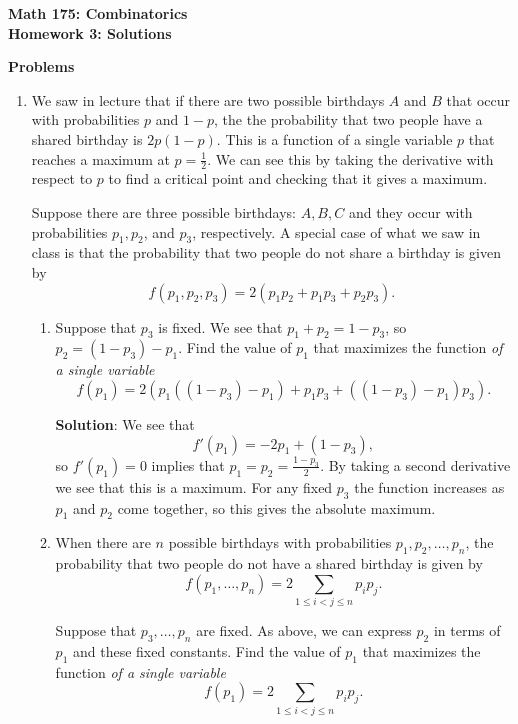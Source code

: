 \documentclass[11pt]{article}
\begin{document}
\begin{center}
{\Large \bf Math 175: Combinatorics} \\
{\Large \bf Homework 3: Solutions}\\
\end{center}

\vspace{5mm}

\centerline{ \bf \Large Problems}


\begin{enumerate}

\item We saw in lecture that if there are two possible birthdays $A$ and $B$  that occur with probabilities $p$ and $1-p$, the the probability that two people have a shared birthday is $2 p(1-p)$.  This is a function of a single variable $p$ that reaches a maximum at $p = \frac{1}{2}$.  We can see this by taking the derivative with respect to $p$ to find a critical point and checking that it gives a maximum.

Suppose there are three possible birthdays: $A,B,C$ and they occur with probabilities $p_1, p_2$, and $p_3$, respectively.  A special case of what we saw in class is that the probability that two people do not share a birthday is given by
\[
f(p_1, p_2, p_3) = 2\left(p_1 p_2 + p_1 p_3 + p_2 p_3\right).
\]
\begin{enumerate}
\item Suppose that $p_3$ is fixed.  We see that $p_1 + p_2 = 1-p_3$, so $p_2 = (1-p_3) - p_1$.  Find the value of $p_1$ that maximizes the function \emph{of a single variable}
\[
f(p_1) = 2 \left(p_1 ((1-p_3) - p_1) + p_1 p_3 + ((1-p_3) - p_1) p_3\right).
\]


{\bf Solution}:  We see that 
\[
f'(p_1) = -2 p_1 + (1- p_3),
\]
so $f'(p_1) = 0$ implies that $p_1 = p_2 = \frac{1-p_3}{2}$.  By taking a second derivative we see that this is a maximum.  For any fixed $p_3$ the function increases as $p_1$ and $p_2$ come together, so this gives the absolute maximum.



\item When there are $n$ possible birthdays with probabilities $p_1,p_2,\ldots, p_n$, the probability that two people do not have a shared birthday is given by
\[
f(p_1,\ldots, p_n) = 2 \sum_{1\le i < j \le n} p_i p_j.
\]

Suppose that $p_3,\ldots, p_n$ are fixed.  As above, we can express $p_2$ in terms of $p_1$ and these fixed constants.  Find the value of $p_1$ that maximizes the function \emph{of a single variable}
\[
f(p_1) = 2 \sum_{1\le i < j \le n} p_i p_j.
\]



\end{enumerate}
\end{enumerate}
\end{document}
